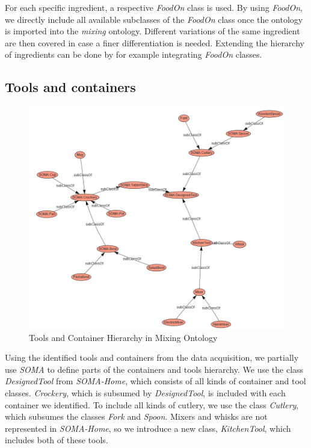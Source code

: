 For each specific ingredient, a respective \textit{FoodOn} class is used. By using \textit{FoodOn}, we directly include all available subclasses of the 
\textit{FoodOn} class once the ontology is imported into the \textit{mixing} ontology.
Different variations of the same ingredient are then covered in case a finer differentiation is needed. 
Extending the hierarchy of ingredients can be done by for example integrating \textit{FoodOn} classes.  

\subsection{Tools and containers}
\label{sec:toolsandcontainers}

\begin{figure}[H]
    \includegraphics[scale=0.45]{Graphics/classHierarchy/tools_hierarchy.png}
    \centering
    \caption{Tools and Container Hierarchy in Mixing Ontology}
\end{figure}

Using the identified tools and containers from the data acquisition, we partially use \textit{SOMA} to define parts of the containers and tools hierarchy.
We use the class \textit{DesignedTool} from \textit{SOMA-Home}, which consists of all kinds of container and tool classes. 
\textit{Crockery}, which is subsumed by \textit{DesignedTool}, is included with each container we identified. 
To include all kinds of cutlery, we use the class \textit{Cutlery}, which subsumes the classes \textit{Fork} and \textit{Spoon}. 
Mixers and whisks are not represented in \textit{SOMA-Home}, so we introduce a new class, \textit{KitchenTool}, which includes both of these tools.

